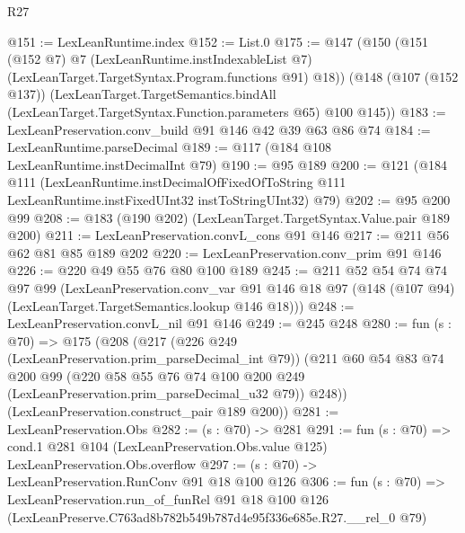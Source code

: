 \begin{lexlean}{R27}
\begin{coremodule}
@151 := LexLeanRuntime.index
@152 := List.{0}
@175 := @147
    (@150
      (@151
        (@152 @7)
        @7
        (LexLeanRuntime.instIndexableList @7)
        (LexLeanTarget.TargetSyntax.Program.functions @91)
        @18))
    (@148
      (@107 (@152 @137))
      (LexLeanTarget.TargetSemantics.bindAll
        (LexLeanTarget.TargetSyntax.Function.parameters @65)
        @100
        @145))
@183 := LexLeanPreservation.conv_build @91 @146 @42 @39 @63 @86 @74
@184 := LexLeanRuntime.parseDecimal
@189 := @117 (@184 @108 LexLeanRuntime.instDecimalInt @79)
@190 := @95 @189
@200 := @121
    (@184
      @111
      (LexLeanRuntime.instDecimalOfFixedOfToString
        @111
        LexLeanRuntime.instFixedUInt32
        instToStringUInt32)
      @79)
@202 := @95 @200 @99
@208 := @183 (@190 @202) (LexLeanTarget.TargetSyntax.Value.pair @189 @200)
@211 := LexLeanPreservation.convL_cons @91 @146
@217 := @211 @56 @62 @81 @85 @189 @202
@220 := LexLeanPreservation.conv_prim @91 @146
@226 := @220 @49 @55 @76 @80 @100 @189
@245 := @211
    @52
    @54
    @74
    @74
    @97
    @99
    (LexLeanPreservation.conv_var
      @91
      @146
      @18
      @97
      (@148 (@107 @94) (LexLeanTarget.TargetSemantics.lookup @146 @18)))
@248 := LexLeanPreservation.convL_nil @91 @146
@249 := @245 @248
@280 := fun (s : @70) =>
  @175
    (@208
      (@217
        (@226 @249 (LexLeanPreservation.prim_parseDecimal_int @79))
        (@211
          @60
          @54
          @83
          @74
          @200
          @99
          (@220 @58 @55 @76 @74 @100 @200 @249 (LexLeanPreservation.prim_parseDecimal_u32 @79))
          @248))
      (LexLeanPreservation.construct_pair @189 @200))
@281 := LexLeanPreservation.Obs
@282 := (s : @70) -> @281
@291 := fun (s : @70) =>
  cond.{1} @281 @104 (LexLeanPreservation.Obs.value @125) LexLeanPreservation.Obs.overflow
@297 := (s : @70) -> LexLeanPreservation.RunConv @91 @18 @100 @126
@306 := fun (s : @70) =>
  LexLeanPreservation.run_of_funRel
    @91
    @18
    @100
    @126
    (LexLeanPreserve.C763ad8b782b549b787d4e95f336e685e.R27.__rel_0 @79)
\end{coremodule}
\end{lexlean}
